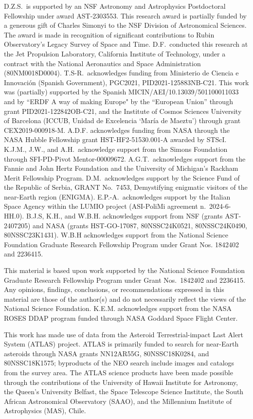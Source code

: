 \documentclass[linenumbers,twocolumn,longbib]{aastex7}
\begin{document}
\begin{acknowledgments}

D.Z.S.\ is supported by an NSF Astronomy and Astrophysics Postdoctoral Fellowship under award AST-2303553. This research award is partially funded by a generous gift of Charles Simonyi to the NSF Division of Astronomical Sciences. The award is made in recognition of significant contributions to Rubin Observatory's Legacy Survey of Space and Time.
D.F.\ conducted this research at the Jet Propulsion Laboratory, California Institute of Technology, under a contract with the National Aeronautics and Space Administration (80NM0018D0004).
T.S-R.\ acknowledges funding from Ministerio de Ciencia e Innovaci{\'o}n (Spanish Government), PGC2021, PID2021-125883NB-C21. This work was (partially) supported by the Spanish MICIN/AEI/10.13039/501100011033 and by ``ERDF A way of making Europe" by the “European Union” through grant PID2021-122842OB-C21, and the Institute of Cosmos Sciences University of Barcelona (ICCUB, Unidad de Excelencia `Mar\'ia de Maeztu’) through grant CEX2019-000918-M. A.D.F. acknowledges funding from NASA through the NASA Hubble Fellowship grant HST-HF2-51530.001-A awarded by STScI. K.J.M., J.W., and A.H.\ acknowledge support from the Simons Foundation through SFI-PD-Pivot Mentor-00009672. A.G.T.\ acknowledges support from the Fannie and John Hertz Foundation and the University of Michigan's Rackham Merit Fellowship Program. D.M.\ acknowledges support by the Science Fund of the Republic of Serbia, GRANT No.\ 7453, Demystifying enigmatic visitors of the near-Earth region (ENIGMA). E.P.-A.\ acknowledges support by the Italian Space Agency within the LUMIO project (ASI-PoliMi agreement n.\ 2024-6-HH.0).  B.J.S, K.H., and W.B.H. acknowledges support from NSF (grants AST-2407205) and NASA (grants HST-GO-17087, 80NSSC24K0521, 80NSSC24K0490, 80NSSC23K1431).  W.B.H acknowledges support from the National Science Foundation Graduate Research Fellowship Program under Grant Nos. 1842402 and 2236415.

This material is based upon work supported by the National Science Foundation Graduate Research Fellowship Program under Grant Nos.\ 1842402 and 2236415. Any opinions, findings, conclusions, or recommendations expressed in this material are those of the author(s) and do not necessarily reflect the views of the National Science Foundation. K.E.M. acknowledges support from the NASA ROSES DDAP program funded through NASA Goddard Space Flight Center.

This work has made use of data from the Asteroid Terrestrial-impact Last Alert System (ATLAS) project. ATLAS is primarily funded to search for near-Earth asteroids through NASA grants NN12AR55G, 80NSSC18K0284, and 80NSSC18K1575; byproducts of the NEO search include images and catalogs from the survey area.  The ATLAS science products have been  made possible through the contributions of the University of Hawaii Institute for Astronomy, the Queen's University Belfast, the Space Telescope Science Institute, the South African Astronomical Observatory (SAAO), and the Millennium Institute of Astrophysics (MAS), Chile.


\end{acknowledgments}
\end{document}
